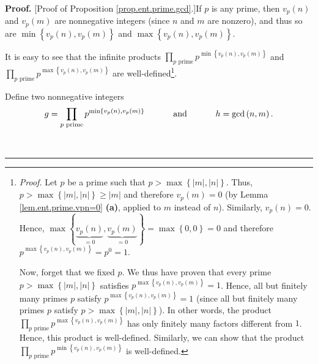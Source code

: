\documentclass[numbers=enddot,12pt,final,onecolumn,notitlepage]{scrartcl}%
\numberwithin{exer}{subsection}
\theoremstyle{definition}
\newenvironment{proof}[1][Proof]{\noindent\textbf{#1.} }{\ \rule{0.5em}{0.5em}}
\let\prodnonlimits\prod
\renewcommand{\prod}{\prodnonlimits\limits}
\begin{document}
\begin{proof}
[Proof of Proposition \ref{prop.ent.prime.gcd}.]If $p$ is any prime, then
$v_{p}\left(  n\right)  $ and $v_{p}\left(  m\right)  $ are nonnegative
integers (since $n$ and $m$ are nonzero), and thus so are $\min\left\{
v_{p}\left(  n\right)  ,v_{p}\left(  m\right)  \right\}  $ and $\max\left\{
v_{p}\left(  n\right)  ,v_{p}\left(  m\right)  \right\}  $.

It is easy to see that the infinite products $\prod_{p\text{ prime}}%
p^{\min\left\{  v_{p}\left(  n\right)  ,v_{p}\left(  m\right)  \right\}  }$
and \newline$\prod_{p\text{ prime}}p^{\max\left\{  v_{p}\left(  n\right)
,v_{p}\left(  m\right)  \right\}  }$ are well-defined\footnote{\textit{Proof.}
Let $p$ be a prime such that $p>\max\left\{  \left\vert m\right\vert
,\left\vert n\right\vert \right\}  $. Thus, $p>\max\left\{  \left\vert
m\right\vert ,\left\vert n\right\vert \right\}  \geq\left\vert m\right\vert $
and therefore $v_{p}\left(  m\right)  =0$ (by Lemma \ref{lem.ent.prime.vpn=0}
\textbf{(a)}, applied to $m$ instead of $n$). Similarly, $v_{p}\left(
n\right)  =0$. Hence, $\max\left\{  \underbrace{v_{p}\left(  n\right)  }%
_{=0},\underbrace{v_{p}\left(  m\right)  }_{=0}\right\}  =\max\left\{
0,0\right\}  =0$ and therefore $p^{\max\left\{  v_{p}\left(  n\right)
,v_{p}\left(  m\right)  \right\}  }=p^{0}=1$.
\par
Now, forget that we fixed $p$. We thus have proven that every prime
$p>\max\left\{  \left\vert m\right\vert ,\left\vert n\right\vert \right\}  $
satisfies $p^{\max\left\{  v_{p}\left(  n\right)  ,v_{p}\left(  m\right)
\right\}  }=1$. Hence, all but finitely many primes $p$ satisfy $p^{\max
\left\{  v_{p}\left(  n\right)  ,v_{p}\left(  m\right)  \right\}  }=1$ (since
all but finitely many primes $p$ satisfy $p>\max\left\{  \left\vert
m\right\vert ,\left\vert n\right\vert \right\}  $). In other words, the
product $\prod_{p\text{ prime}}p^{\max\left\{  v_{p}\left(  n\right)
,v_{p}\left(  m\right)  \right\}  }$ has only finitely many factors different
from $1$. Hence, this product is well-defined. Similarly, we can show that the
product $\prod_{p\text{ prime}}p^{\min\left\{  v_{p}\left(  n\right)
,v_{p}\left(  m\right)  \right\}  }$ is well-defined.}.

Define two nonnegative integers%
\begin{equation}
g=\prod\limits_{p\text{ prime}}p^{\min\left\{  v_{p}\left(  n\right)
,v_{p}\left(  m\right)  \right\}  }\ \ \ \ \ \ \ \ \ \ \text{and}%
\ \ \ \ \ \ \ \ \ \ h=\gcd\left(  n,m\right)  .
\label{pf.prop.ent.prime.gcd.g=h=}%
\end{equation}



\end{proof}
\end{document}
